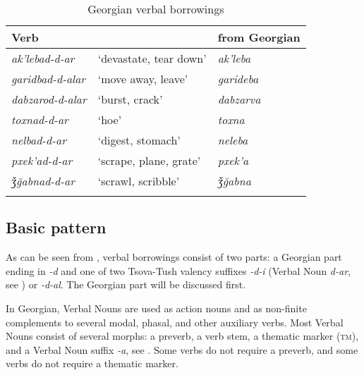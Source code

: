 \begin{table}
	\begin{tabular}{lll}
		\lsptoprule
		Verb & & from Georgian \\
        \midrule
		\textit{ak'lebad-d-ar}	& `devastate, tear down' & \textit{ak'leba} \\
		\textit{garidbad-d-alar}	& `move away, leave' &	\textit{garideba} \\ 
		\textit{dabzarod-d-alar}	& `burst, crack' &	\textit{dabzarva} \\
		\textit{toxnad-d-ar}	& `hoe' &	\textit{toxna} \\
		\textit{nelbad-d-ar}	& `digest, stomach' &	\textit{neleba} \\ 
		\textit{pxek'ad-d-ar}	& `scrape, plane, grate' &	\textit{pxek'a} \\ 
		\textit{ǯ\u{g}abnad-d-ar}	& `scrawl, scribble' &	\textit{ǯ\u{g}abna} \\
		\lspbottomrule
	\end{tabular}
	\caption{Georgian verbal borrowings}
	\label{table-verbborrow1}
\end{table}

\subsection{Basic pattern} \label{verbloanbasic}

As can be seen from , verbal borrowings consist of two parts: a Georgian part ending in \textit{-d} and one of two Tsova-Tush valency suffixes \textit{-d-i} (Verbal Noun \textit{d-ar}, see ) or \textit{-d-al}. The Georgian part will be discussed first.

In Georgian, Verbal Nouns are used as action nouns and as non-finite complements to several modal, phasal, and other auxiliary verbs. Most Verbal Nouns consist of several morphs: a preverb, a verb stem, a thematic marker (\textsc{tm}), and a Verbal Noun suffix \textit{-a}, see . Some verbs do not require a preverb, and some verbs do not require a thematic marker. 

